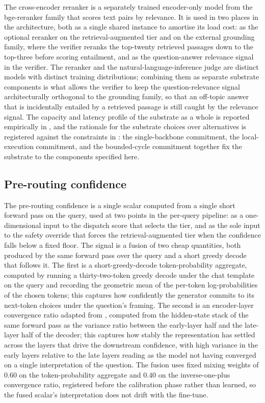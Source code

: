 The cross-encoder reranker is a separately trained encoder-only model from the bge-reranker family that scores text pairs by relevance. It is used in two places in the architecture, both as a single shared instance to amortise its load cost: as the optional reranker on the retrieval-augmented tier and on the external grounding family, where the verifier reranks the top-twenty retrieved passages down to the top-three before scoring entailment, and as the question-answer relevance signal in the verifier. The reranker and the natural-language-inference judge are distinct models with distinct training distributions; combining them as separate substrate components is what allows the verifier to keep the question-relevance signal architecturally orthogonal to the grounding family, so that an off-topic answer that is incidentally entailed by a retrieved passage is still caught by the relevance signal. The capacity and latency profile of the substrate as a whole is reported empirically in , and the rationale for the substrate choices over alternatives is registered against the constraints in : the single-backbone commitment, the local-execution commitment, and the bounded-cycle commitment together fix the substrate to the components specified here.

\subsection{Pre-routing confidence}
\label{sec:pre-routing}

The pre-routing confidence is a single scalar computed from a single short forward pass on the query, used at two points in the per-query pipeline: as a one-dimensional input to the dispatch score that selects the tier, and as the sole input to the safety override that forces the retrieval-augmented tier when the confidence falls below a fixed floor. The signal is a fusion of two cheap quantities, both produced by the same forward pass over the query and a short greedy decode that follows it. The first is a short-greedy-decode token-probability aggregate, computed by running a thirty-two-token greedy decode under the chat template on the query and recording the geometric mean of the per-token log-probabilities of the chosen tokens; this captures how confidently the generator commits to its next-token choices under the question's framing. The second is an encoder-layer convergence ratio adapted from \cite{nandakishor2025routing}, computed from the hidden-state stack of the same forward pass as the variance ratio between the early-layer half and the late-layer half of the decoder; this captures how stably the representation has settled across the layers that drive the downstream confidence, with high variance in the early layers relative to the late layers reading as the model not having converged on a single interpretation of the question. The fusion uses fixed mixing weights of $0.60$ on the token-probability aggregate and $0.40$ on the inverse-one-plus convergence ratio, registered before the calibration phase rather than learned, so the fused scalar's interpretation does not drift with the fine-tune.

